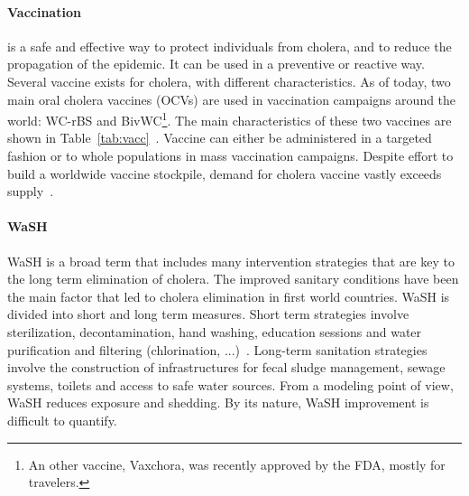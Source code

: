 \paragraph{Vaccination} is a safe and effective way to protect individuals from cholera, and to reduce the propagation of the epidemic. It can be used in a preventive or reactive way. Several vaccine exists for cholera, with different characteristics. As of today, two main oral cholera vaccines (OCVs) are used in vaccination campaigns around the world: WC-rBS and BivWC\footnote{An other vaccine, Vaxchora, was recently approved by the FDA, mostly for travelers.}. The main characteristics of these two vaccines are shown in Table~\ref{tab:vacc}~\cite{who_cholera_2017,who_background_2017, azman_population-level_2016, luquero_first_2013}. Vaccine can either be administered in a targeted fashion or to whole populations in mass vaccination campaigns. Despite effort to build a worldwide vaccine stockpile, demand for cholera vaccine vastly exceeds supply~\cite{parker_adapting_2017,seidlein_preventing_2018}.


\paragraph{WaSH} WaSH is a broad term that includes many intervention strategies that are key to the long term elimination of cholera. The improved sanitary conditions have been the main factor that led to cholera elimination  in first world countries. WaSH is divided into short and long term measures. Short term strategies involve sterilization, decontamination, hand washing, education sessions and water purification and filtering (chlorination, ...)~\cite{rebaudet_national_2018, fewtrell_water_2005}. Long-term sanitation strategies involve the construction of infrastructures for fecal sludge management, sewage systems, toilets and access to safe water sources. From a modeling point of view, WaSH reduces exposure and shedding. By its nature, WaSH improvement is difficult to quantify.






